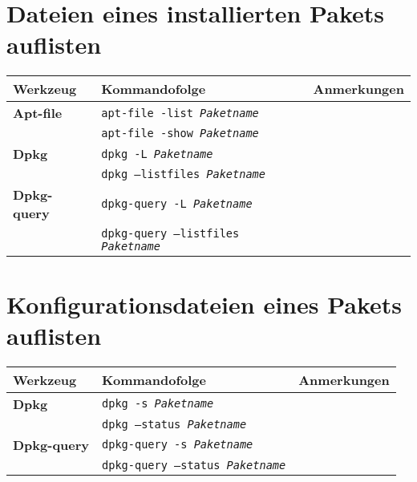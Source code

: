 \documentclass[10pt]{article}
\begin{document}
\section{Dateien eines installierten Pakets auflisten}
\begin{tabular}{ p{3.5cm} p{9cm} p{11cm}}
  \hline
  \rowcolor{Gray}
  \textbf{Werkzeug} & \textbf{Kommandofolge} & \textbf{Anmerkungen} \\
  \hline 
  \textbf{Apt-file} & \texttt{apt-file -list \textit{Paketname}} & \\
  \rowcolor{Gray}
  & \texttt{apt-file -show \textit{Paketname}} & \\
  \textbf{Dpkg} & \texttt{dpkg -L \textit{Paketname}} & \\
  \rowcolor{Gray}
  & \texttt{dpkg --listfiles \textit{Paketname}} & \\
  \textbf{Dpkg-query} & \texttt{dpkg-query -L \textit{Paketname}} & \\
  \rowcolor{Gray}
  & \texttt{dpkg-query --listfiles \textit{Paketname}} & \\
  \hline
\end{tabular}

\section{Konfigurationsdateien eines Pakets auflisten}
\begin{tabular}{ p{3.5cm} p{9cm} p{11cm}}
  \hline
  \rowcolor{Gray}
  \textbf{Werkzeug} & \textbf{Kommandofolge} & \textbf{Anmerkungen} \\
  \hline 
  \textbf{Dpkg} & \texttt{dpkg -s \textit{Paketname}} & \\
  \rowcolor{Gray}
  & \texttt{dpkg --status \textit{Paketname}} & \\
  \textbf{Dpkg-query} & \texttt{dpkg-query -s \textit{Paketname}} & \\
  \rowcolor{Gray}
  & \texttt{dpkg-query --status \textit{Paketname}} & \\
  \hline
\end{tabular}
\end{document}
